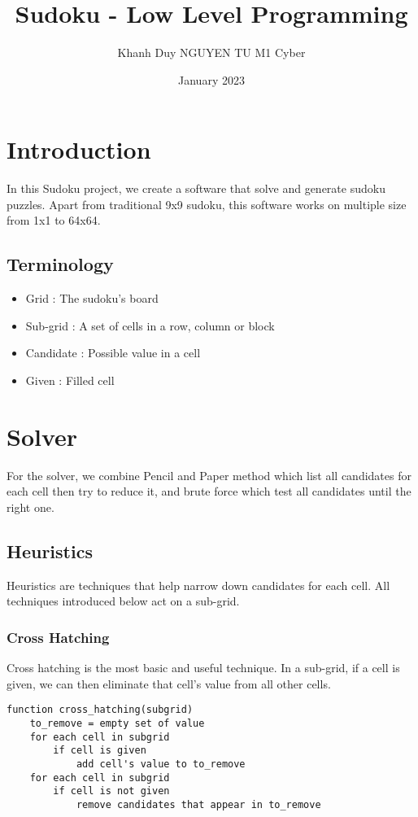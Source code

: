 \documentclass{article}
\title{Sudoku - Low Level Programming}
\author{Khanh Duy NGUYEN TU M1 Cyber}
\date{January 2023}
\begin{document}
\maketitle
\newpage
\tableofcontents
\newpage
\section{Introduction}
In this Sudoku project, we create a software that solve and generate sudoku puzzles. Apart from traditional 9x9 sudoku, this software works on multiple size from 1x1 to 64x64.
\subsection{Terminology}
\begin{itemize}
    \item Grid : The sudoku's board
    \item Sub-grid : A set of cells in a row, column or block
    \item Candidate : Possible value in a cell
    \item Given : Filled cell
\end{itemize}
\section{Solver}
For the solver, we combine Pencil and Paper method which list all candidates for each cell then try to reduce it, and brute force which test all candidates until the right one. 
\subsection{Heuristics}
Heuristics are techniques that help narrow down candidates for each cell. All techniques introduced below act on a sub-grid.
\subsubsection{Cross Hatching}
Cross hatching is the most basic and useful technique. In a sub-grid, if a cell is given, we can then eliminate that cell's value from all other cells.
\begin{lstlisting}
function cross_hatching(subgrid)
    to_remove = empty set of value
    for each cell in subgrid
        if cell is given
            add cell's value to to_remove
    for each cell in subgrid
        if cell is not given
            remove candidates that appear in to_remove
\end{lstlisting}
\end{document}
